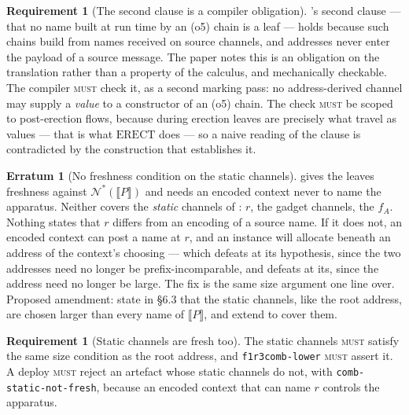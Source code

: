 \documentclass[11pt,a4paper]{article}
\newcommand{\code}[1]{\texttt{#1}}
\newcommand{\MUST}{\textsc{must}}
\newcommand{\enc}[1]{\llbracket #1 \rrbracket}
\newcommand{\nms}[1]{\mathcal{N}^{*}(#1)}
\newcommand{\ERECT}{\mathrm{ERECT}}
\theoremstyle{definition}
\newtheorem{requirement}[definition]{Requirement}
\newtheorem{erratum}[definition]{Erratum}
\theoremstyle{plain}
\begin{document}
\begin{requirement}[The second clause is a compiler obligation]
\label{req:o5noaddr}
\cite[Lem.~6.14]{draft3}'s second clause --- that no name built at run time by
an (o5) chain is a leaf --- holds because such chains build from names
received on source channels, and addresses never enter the payload of a source
message. The paper notes this is an obligation on the translation rather than
a property of the calculus, and mechanically checkable. The compiler \MUST{}
check it, as a second marking pass: no address-derived channel may supply a
\emph{value} to a constructor of an (o5) chain. The check \MUST{} be scoped to
post-erection flows, because during erection leaves are precisely what travel
as values --- that is what $\ERECT$ does --- so a naive reading of the clause
is contradicted by the construction that establishes it.
\end{requirement}

\begin{erratum}[No freshness condition on the static channels]
\label{err:staticfresh}
\cite[Lem.~6.14]{draft3} gives the leaves freshness against $\nms{\enc{P}}$
and \cite[Lem.~7.6]{draft3} needs an encoded context never to name the
apparatus. Neither covers the \emph{static} channels of
\cite[Def.~6.8]{draft3}: $r$, the gadget channels, the $f_{A}$. Nothing states
that $r$ differs from an encoding of a source name. If it does not, an encoded
context can post a name at $r$, and an instance will allocate beneath an
address of the context's choosing --- which defeats
\cite[Lem.~6.11]{draft3} at its hypothesis, since the two addresses need no
longer be prefix-incomparable, and defeats \cite[Lem.~6.14]{draft3} at its,
since the address need no longer be large. The fix is the same size argument
one line over. Proposed amendment: state in \S6.3 that the static channels,
like the root address, are chosen larger than every name of $\enc{P}$, and
extend \cite[Lem.~7.6]{draft3} to cover them.
\end{erratum}

\begin{requirement}[Static channels are fresh too]\label{req:staticfresh}
The static channels \MUST{} satisfy the same size condition as the root
address, and \code{f1r3comb-lower} \MUST{} assert it. A deploy \MUST{} reject
an artefact whose static channels do not, with
\code{comb-static-not-fresh}, because an encoded context that can name $r$
controls the apparatus.
\end{requirement}
\end{document}
